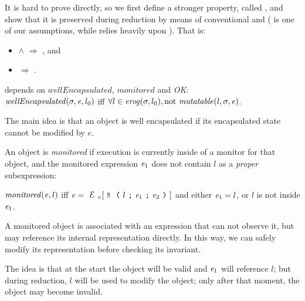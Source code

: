 It is hard to prove  directly,
so we first define a stronger property,
called , and
show that it is preserved during reduction by means of conventional
 and  ( is one of our assumptions,
while  relies heavily upon ).
That is:
\begin{itemize}
\item {} $\wedge$  $\Rightarrow$ , and
\item {} $\Rightarrow$ .
\end{itemize}


 depends on
$\mathit{wellEncapsulated}$, $\mathit{monitored}$
and \emph{OK}:\\
\indent $\mathit{wellEncapsulated}(\sigma,{\mathit{e}},l_0)$ iff
$\forall l \in \mathit{erog}(\sigma,l_0), \text{not}\ \mathit{mutatable}(l,\sigma,{\mathit{e}})$.%

\noindent The main idea is that an object is well encapsulated if its encapsulated state cannot be
modified by $e$.

An object is \emph{monitored} if execution
is currently inside of a monitor for that object, and
the monitored expression ${\mathit{e}}_1$ does not
contain $l$ as a \emph{proper} subexpression:

\indent $\mathit{monitored}({\mathit{e}},l)$ iff
$\e=\ctx_v[\M{l}{\e_1}{\e_2}]$ and either ${\mathit{e}}_1=l$, or $l$ is not inside ${\mathit{e}}_1$.%

\noindent A monitored object is associated with an expression that can not observe it, but may
reference its internal representation directly.
In this way, we can safely modify its representation before checking its invariant.

The idea is that at the start the object will be valid and ${\mathit{e}}_1$ will reference $l$;
but during reduction, $l$ will be used to
modify the object; only after that moment, the object may become invalid.


